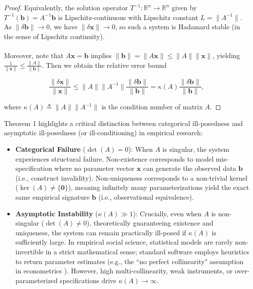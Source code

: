 \documentclass{article}
\theoremstyle{definition}
\begin{document}
\begin{proof}
\noindent
Equivalently, the solution operator $T^{-1}: \mathbb{R}^n \to \mathbb{R}^n$ given by $T^{-1}(\mathbf{b}) = A^{-1}\mathbf{b}$ is Lipschitz-continuous with Lipschitz constant $L = \|A^{-1}\|$. As $\|\delta \mathbf{b}\| \to 0$, we have $\|\delta \mathbf{x}\| \to 0$, so such a system is Hadamard stable (in the sense of Lipschitz continuity). \\
\\
Moreover, note that $A\mathbf{x} = \mathbf{b}$ implies $\|\mathbf{b}\| = \|A\mathbf{x}\| \le \|A\| \|\mathbf{x}\|$, yielding $\frac{1}{\|\mathbf{x}\|} \le \frac{\|A\|}{\|\mathbf{b}\|}$. Then we obtain the relative error bound

\begin{equation}
    \frac{\|\delta \mathbf{x}\|}{\|\mathbf{x}\|} \le \|A\| \|A^{-1}\| \frac{\|\delta \mathbf{b}\|}{\|\mathbf{b}\|} = \kappa(A) \frac{\|\delta \mathbf{b}\|}{\|\mathbf{b}\|},
\end{equation}

\noindent
where $\kappa(A) \triangleq \|A\| \|A^{-1}\|$ is the condition number of matrix $A$.
\end{proof}

\noindent
Theorem 1 highlights a critical distinction between categorical ill-posedness and asymptotic ill-posedness (or ill-conditioning) in empirical research:

\begin{itemize}
    \item \textbf{Categorical Failure} ($\det(A) = 0$): When $A$ is singular, the system experiences structural failure. Non-existence corresponds to model mis-specification where no parameter vector $\mathbf{x}$ can generate the observed data $\mathbf{b}$ (i.e., construct invalidity). Non-uniqueness corresponds to a non-trivial kernel ($\ker(A) \neq \{\mathbf{0}\}$), meaning infinitely many parameterizations yield the exact same empirical signature $\mathbf{b}$ (i.e., observational equivalence).

    \item \textbf{Asymptotic Instability} ($\kappa(A) \gg 1$): Crucially, even when $A$ is non-singular ($\det(A) \neq 0$), theoretically guaranteeing existence and uniqueness, the system can remain practically ill-posed if $\kappa(A)$ is sufficiently large. In empirical social science, statistical models are rarely non-invertible in a strict mathematical sense; standard software employs heuristics to return parameter estimates (e.g., the ``no perfect collinearity" assumption in econometrics \cite{Woo13}). However, high multi-collinearity, weak instruments, or over-parameterized specifications drive $\kappa(A) \to \infty$.
\end{itemize}
\end{document}
